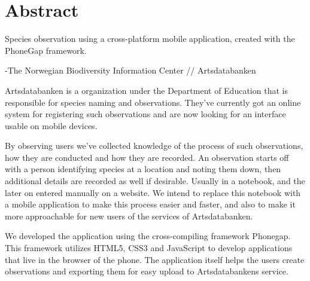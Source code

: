 \section{Abstract}

{\LARGE Species observation using a cross-platform mobile application, created with the PhoneGap framework.}

{\large -The Norwegian Biodiversity Information Center // Artsdatabanken}

Artsdatabanken is a organization under the Department of Education that is responsible for species naming and observations. They’ve currently got an online system for registering such observations and are now looking for an interface usable on mobile devices.

By observing users we’ve collected knowledge of the process of such observations, how they are conducted and how they are recorded. An observation starts off with a person identifying species at a location and noting them down, then additional details are recorded as well if desirable. Usually in a notebook, and the later on entered manually on a website. We intend to replace this notebook with a mobile application to make this process easier and faster, and also to make it more approachable for new users of the services of Artsdatabanken.

We developed the application using the cross-compiling framework Phonegap. This framework utilizes HTML5, CSS3 and JavaScript to develop applications that live in the browser of the phone. The application itself helps the users create observations and exporting them for easy upload to Artsdatabankens service. 
